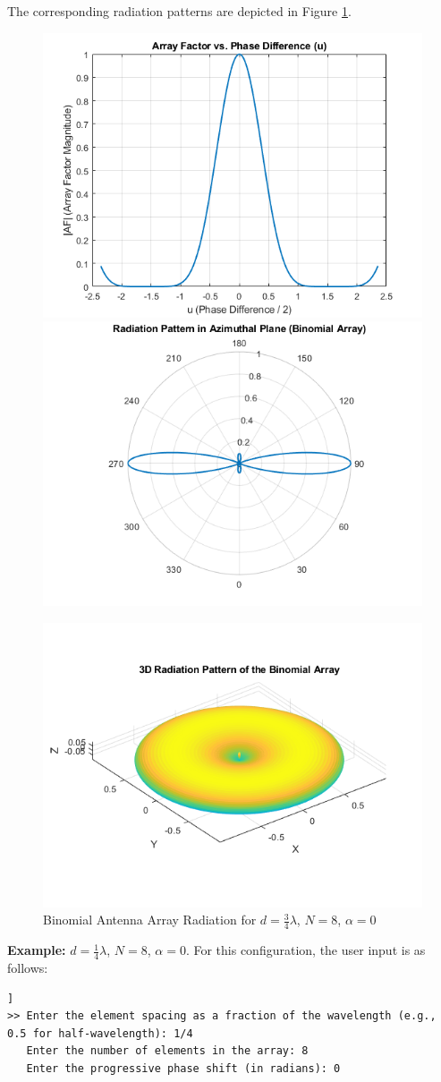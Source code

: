 \documentclass[a4paper, 12pt, english]{article}
\begin{document}
The corresponding radiation patterns are depicted in Figure \ref{fig:binomial 1}.
\begin{figure}[H]
    \centering
         \includegraphics[width=0.49\linewidth]{report/images/binomial_2D_1.png}
         \hfill
         \includegraphics[width=0.49\linewidth]{report/images/binomial_2D_rad_1.png}
         \hfill

         \includegraphics[width=0.49\linewidth]{report/images/binomial_3D_1.png}
         \caption{Binomial Antenna Array Radiation for $ {d} = {\frac{3}{4}}{\lambda} $, $ {N} = {8} $, $ {\alpha} = {0} $}
         \label{fig:binomial 1}
\end{figure}

\noindent
\textbf{Example:} $ {d} = {\frac{1}{4}}{\lambda} $, $ {N} = {8} $, $ {\alpha} = {0} $.
\newline
For this configuration, the user input is as follows:
\begin{lstlisting}[style=commandstyle,caption=Command line output]]
>> Enter the element spacing as a fraction of the wavelength (e.g., 0.5 for half-wavelength): 1/4
   Enter the number of elements in the array: 8
   Enter the progressive phase shift (in radians): 0
\end{lstlisting}
\end{document}
